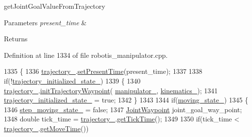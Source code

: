 get\+Joint\+Goal\+Value\+From\+Trajectory 


\begin{DoxyParams}{Parameters}
{\em present\+\_\+time} & \\
\hline
\end{DoxyParams}
\begin{DoxyReturn}{Returns}

\end{DoxyReturn}


Definition at line 1334 of file robotis\+\_\+manipulator.\+cpp.


\begin{DoxyCode}
1335 \{
1336   \hyperlink{classrobotis__manipulator_1_1_robotis_manipulator_a992d2c7221bcaab8e9a688d12728d738}{trajectory\_}.\hyperlink{classrobotis__manipulator_1_1_trajectory_a187822acb94ca96938ebc06019ffc73e}{setPresentTime}(present\_time);
1337 
1338   \textcolor{keywordflow}{if}(!\hyperlink{classrobotis__manipulator_1_1_robotis_manipulator_a6ffca122bf46d7d3bd130cbd7ac9f0e4}{trajectory\_initialized\_state\_})
1339   \{
1340     \hyperlink{classrobotis__manipulator_1_1_robotis_manipulator_a992d2c7221bcaab8e9a688d12728d738}{trajectory\_}.\hyperlink{classrobotis__manipulator_1_1_trajectory_addb10c2af208b5e1040a60b7bbf81952}{initTrajectoryWaypoint}(
      \hyperlink{classrobotis__manipulator_1_1_robotis_manipulator_a5b2df4a3b3ee7f408cb1d0eaf61644dc}{manipulator\_}, \hyperlink{classrobotis__manipulator_1_1_robotis_manipulator_a9a37fd068504dfe5fab346884790fc8f}{kinematics\_});
1341     \hyperlink{classrobotis__manipulator_1_1_robotis_manipulator_a6ffca122bf46d7d3bd130cbd7ac9f0e4}{trajectory\_initialized\_state\_} = \textcolor{keyword}{true};
1342   \}
1343 
1344   \textcolor{keywordflow}{if}(\hyperlink{classrobotis__manipulator_1_1_robotis_manipulator_a5b7990548dd779b1ca66a2ad83a74f76}{moving\_state\_})
1345   \{
1346     \hyperlink{classrobotis__manipulator_1_1_robotis_manipulator_aef8766eb10814f57928dcd9e71ceaccf}{step\_moving\_state\_} = \textcolor{keyword}{false};
1347     \hyperlink{namespacerobotis__manipulator_a4456fd8b14e1f6b7733a77837dfe9339}{JointWaypoint} joint\_goal\_way\_point;
1348     \textcolor{keywordtype}{double} tick\_time = \hyperlink{classrobotis__manipulator_1_1_robotis_manipulator_a992d2c7221bcaab8e9a688d12728d738}{trajectory\_}.\hyperlink{classrobotis__manipulator_1_1_trajectory_aa88cc828dc324d2441cfbafaff15dbb1}{getTickTime}();
1349     
1350     \textcolor{keywordflow}{if}(tick\_time < \hyperlink{classrobotis__manipulator_1_1_robotis_manipulator_a992d2c7221bcaab8e9a688d12728d738}{trajectory\_}.\hyperlink{classrobotis__manipulator_1_1_trajectory_a998cdbaa9895e9a3ea6c7ec49f7b47d9}{getMoveTime}())

\end{DoxyCode}
